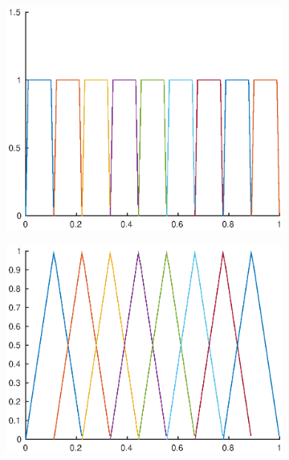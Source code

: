 \begin{figure}
\centering
\begin{subfigure}[b]{.3\linewidth}
  \includegraphics[width=\linewidth]{Pictures/basisconstant}
  \label{fig:bspline_basis_constant}
\end{subfigure}%
\begin{subfigure}[b]{.3\linewidth}
  \includegraphics[width=\linewidth]{Pictures/basislinear}
  \label{fig:bspline_basis_linear}
\end{subfigure}
\begin{subfigure}[b]{.3\linewidth}

\end{subfigure}
\end{figure}
